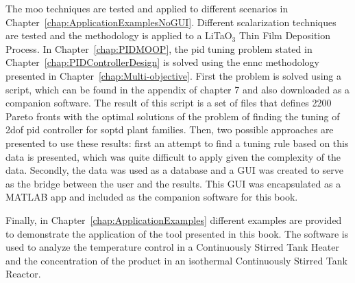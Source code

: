 The \gls{moo} techniques are tested and applied to different scenarios in Chapter~\ref{chap:ApplicationExamplesNoGUI}. Different scalarization techniques are tested and the methodology is applied to a LiTaO$_3$ Thin Film Deposition Process. In Chapter~\ref{chap:PIDMOOP}, the \gls{pid} tuning problem stated in Chapter~\ref{chap:PIDControllerDesign} is solved using the \gls{ennc} methodology presented in Chapter~\ref{chap:Multi-objective}. First the problem is solved using a \matlab  script, which can be found in the appendix of chapter 7 and also downloaded as a companion software. The result of this script is a set of files that defines 2200 Pareto fronts with the optimal solutions of the problem of finding the tuning of \gls{2dof} \gls{pid} controller for \gls{soptd} plant families. Then, two possible approaches are presented to use these results: first an attempt to find a tuning rule based on this data is presented, which was quite difficult to apply given the complexity of the data. Secondly, the data was used as a database and a GUI was created to serve as the bridge between the user and the results. This GUI was encapsulated as a MATLAB app and included as the companion software for this book.

Finally, in Chapter~\ref{chap:ApplicationExamples} different examples are provided to demonstrate the application of the tool presented in this book. The software is used to analyze the temperature control in a Continuously Stirred Tank Heater and the concentration of the product in an isothermal Continuously Stirred Tank Reactor.


